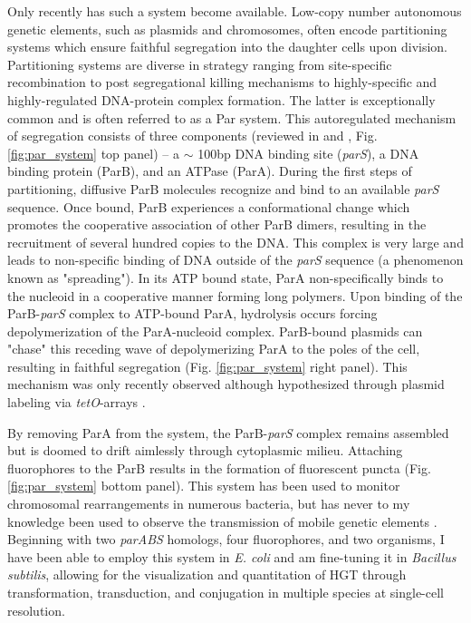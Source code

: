 Only recently has such a system become available. Low-copy number autonomous
genetic elements, such as plasmids and chromosomes, often encode partitioning
systems which ensure faithful segregation into the daughter cells upon division.
Partitioning systems are diverse in strategy ranging from site-specific
recombination to post segregational killing mechanisms to highly-specific and
highly-regulated DNA-protein complex formation. The latter is exceptionally
common and is often referred to as a Par system. This autoregulated mechanism of
segregation consists of three components (reviewed in \citet{Funnell:2004wi} and
\citet{Bignell:2001ti}, Fig. \ref{fig:par_system} top panel) -- a $\sim$ 100bp
DNA binding site (\textit{parS}), a DNA binding protein (ParB), and an ATPase
(ParA). During the first steps of partitioning, diffusive ParB molecules
recognize and bind to an available \textit{parS} sequence. Once bound, ParB
experiences a conformational change which promotes the cooperative association
of other ParB dimers, resulting in the recruitment of several hundred copies to
the DNA. This complex is very large and leads to non-specific binding of DNA
outside of the \textit{parS} sequence (a phenomenon known as "spreading"). In
its ATP bound state, ParA non-specifically binds to the nucleoid in a
cooperative manner forming long polymers. Upon binding of the
ParB-\textit{parS} complex to ATP-bound ParA, hydrolysis occurs forcing
depolymerization of the ParA-nucleoid complex. ParB-bound plasmids can "chase"
this receding wave of depolymerizing ParA to the poles of the cell, resulting in
faithful segregation (Fig. \ref{fig:par_system} right panel).  This mechanism was only recently observed although
hypothesized through plasmid
labeling via \textit{tetO}-arrays \cite{Ringgaard:2009uh}.

By removing ParA from the system, the ParB-\textit{parS} complex remains
assembled but is doomed to drift aimlessly through cytoplasmic milieu. Attaching
fluorophores to the ParB results in the formation of fluorescent puncta (Fig.
\ref{fig:par_system} bottom panel). This system has been used to monitor
chromosomal rearrangements in numerous bacteria, but has never to my knowledge
been used to observe the transmission of mobile genetic
elements \cite{Nielsen:2006hmb, Nielsen:2007ct, Shebelut:2010ic,
Broedersz:2014jz}. Beginning with two \textit{parABS} homologs, four
fluorophores, and two organisms, I have been able to employ this system in
\textit{E. coli} and am fine-tuning it in \textit{Bacillus subtilis}, allowing
for the visualization and quantitation of HGT through transformation,
transduction, and conjugation in multiple species at single-cell resolution. 

